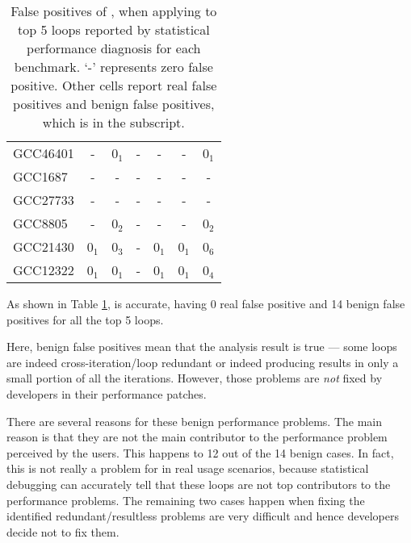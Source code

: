 \begin{table}
\begin{tabular}{lcccccc}
   \midrule
   GCC46401              &   -                  & 0$_1$                       & -                       & -                     &   -             & 0$_1$\\
   GCC1687               &   -                  & -                           & -                       & -                     &   -             & -\\
   GCC27733          &   -                  & -                           & -                       & -                     &   -             & - \\
   GCC8805               &   -                  & 0$_2$                       & -                       & -                     &   -             & 0$_2$\\
   GCC21430              &   0$_1$              & 0$_3$                       & -                       & 0$_1$                 &   0$_1$         & 0$_6$\\
   GCC12322              &   0$_1$              & 0$_1$                       & -                       & 0$_1$                 &   0$_1$         & 0$_4$\\
\bottomrule
   \end{tabular}
  \caption{False positives of \Tool, when applying to top 5 loops reported by 
    statistical performance diagnosis for each benchmark. `-' represents zero false positive.
    Other cells report real false positives and benign false positives, which is in the
    subscript.
}
  \label{tab:6_top5}
\end{table}

As shown in Table \ref{tab:6_top5}, \Tool is accurate, having 0 real
false positive and 14 benign false positives for all the top 5 loops.

Here, benign false positives mean that the \Tool analysis result is true ---
some loops are indeed cross-iteration/loop redundant or indeed producing
results in only a small portion of all the iterations. However, those
problems are \textit{not} fixed by developers in their performance patches. 

There are several reasons for these benign performance problems. 
The main reason is that they are not the main contributor to the 
performance problem perceived by the users. This happens to 12 out of the
14 benign cases. In fact, this is not really a problem for \Tool in 
real usage scenarios, because statistical debugging can accurately
tell that these loops are not top contributors to the performance
problems.
The remaining two cases happen when fixing the 
identified redundant/resultless problems
are very difficult and hence developers decide not to fix them.

